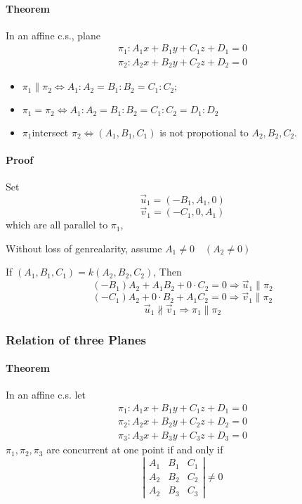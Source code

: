 \documentclass[11pt]{book}
\begin{document}
\paragraph{Theorem} In an affine c.s., plane 
$$
\begin{array}{l}
  \pi_{1}: A_{1} x+B_{1} y+C_{1} z+D_{1}=0 \\
  \pi_{2}: A_{2} x+B_{2} y+C_{2} z+D_{2}=0
  \end{array}
$$
\begin{itemize}
  \item 
    $\pi_{1} \parallel \pi_{2} \Longleftrightarrow A_{1}: A_{2}=B_{1}: B_{2}=C_{1}: C_{2} ;$
  \item $\pi_{1}=\pi_{2} \Longleftrightarrow A_{1}: A_{2}=B_{1}: B_{2}=C_{1}: C_{2}=D_{1}: D_{2}$
  \item $\pi_{1} $intersect $\pi_{2}  \iff (A_1,B_1,C_1)$ is not propotional to $A_2,B_2,C_2$.
\end{itemize}

\paragraph{Proof}
Set 
$$
\vec u_1 = (-B_1,A_1,0)
$$
$$
\vec v_1 = (-C_1,0,A_1)
$$
which are all parallel to $\pi_1$,

Without loss of genrealarity,  assume $A_1\neq 0\quad (A_2\neq 0)$

If $(A_1,B_1,C_1)=k(A_2,B_2,C_2)$, Then 
$$
(-B_1)A_2+A_1B_2+0\cdot C_2=0 \Rightarrow \vec u_1 \parallel \pi_2
$$
$$
(-C_1)A_2+0\cdot B_2+ A_1C_2=0 \Rightarrow \vec v_1 \parallel \pi_2
$$
$$
\vec u_1 \not \parallel \vec v_1 \Rightarrow \pi_1 \parallel \pi_2
$$
\subsubsection{Relation of three Planes}
\paragraph{Theorem} In an affine c.s.
let
$$
\begin{array}{l}
\pi_{1}: A_{1} x+B_{1} y+C_{1} z+D_{1}=0 \\
\pi_{2}: A_{2} x+B_{2} y+C_{2} z+D_{2}=0 \\
\pi_{3}: A_{3} x+B_{3} y+C_{3} z+D_{3}=0
\end{array}
$$
$\pi_{1}, \pi_{2}, \pi_{3}$ are concurrent at one point if and only if 
$$
\left|\begin{array}{lll}
A_{1} & B_{1} & C_{1} \\
A_{2} & B_{2} & C_{2} \\
A_{2} & B_{3} & C_{3}
\end{array}\right| \neq 0
$$
\end{document}
